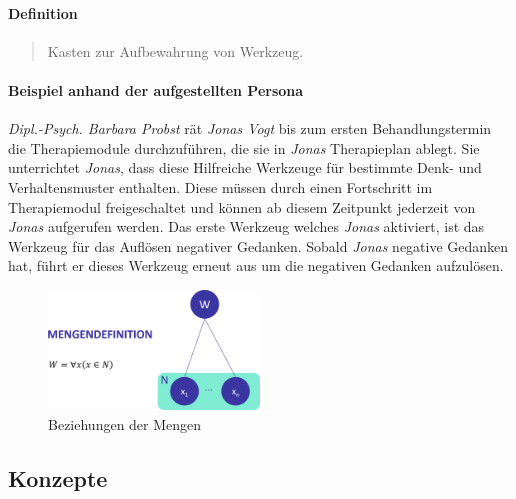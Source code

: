 \paragraph{Definition}
\begin{quote}
Kasten zur Aufbewahrung von Werkzeug. \cite{DudenWer23:online}
\end{quote}

\paragraph{Beispiel anhand der aufgestellten Persona}
\emph{Dipl.-Psych. Barbara Probst} rät \emph{Jonas Vogt} bis zum ersten Behandlungstermin die Therapiemodule durchzuführen, die sie in \emph{Jonas} Therapieplan ablegt. Sie unterrichtet \emph{Jonas}, dass diese Hilfreiche Werkzeuge für bestimmte Denk- und Verhaltensmuster enthalten. Diese müssen durch einen Fortschritt im Therapiemodul freigeschaltet und können ab diesem Zeitpunkt jederzeit von \emph{Jonas} aufgerufen werden. Das erste Werkzeug welches \emph{Jonas} aktiviert, ist das Werkzeug für das Auflösen negativer Gedanken. Sobald \emph{Jonas} negative Gedanken hat, führt er dieses Werkzeug erneut aus um die negativen Gedanken aufzulösen.

\begin{figure}[h]
\centering
\includegraphics[width=0.5\textwidth]{pictures/toolboxdef}
\caption{Beziehungen der Mengen}
\label{therapiedef}
\end{figure}





\subsection{Konzepte}

